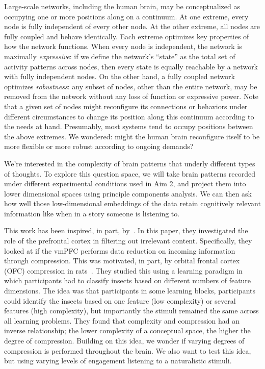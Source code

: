 \documentclass[english]{article}
\begin{document}
Large-scale networks, including the human brain, may be conceptualized as
occupying one or more positions along on a continuum. At one extreme, every
node is fully independent of every other node. At the other extreme, all nodes
are fully coupled and behave identically. Each extreme optimizes key properties
of how the network functions. When every node is independent, the network is
maximally \textit{expressive}: if we define the network's ``state'' as the
total set of activity patterns across nodes, then every state is equally
reachable by a network with fully independent nodes. On the other hand, a fully
coupled network optimizes \textit{robustness}: any subset of nodes, other than
the entire network, may be removed from the network without any loss of
function or expressive power. Note that a given set of nodes might reconfigure
its connections or behaviors under different circumstances to change its
position along this continuum according to the needs at hand. Presumably, most
systems tend to occupy positions between the above extremes. We wondered: might
the human brain reconfigure itself to be more flexible or more robust according
to ongoing demands?






We're interested in the complexity of brain patterns that underly different
types of thoughts. To explore this question space, we will take brain patterns
recorded under different experimental conditions used in Aim 2, and project
them into lower dimensional spaces using principle components analysis. We can
then ask how well those low-dimensional embeddings of the data retain
cognitively relevant information like when in a story someone is listening to.

This work has been inspired, in part, by~\cite{MackEtal20}. In this paper, they
investigated the role of the prefrontal cortex in filtering out irrelevant
content. Specifically, they looked at if the vmPFC performs data reduction on
incoming information through compression. This was motivated, in part, by
orbital frontal cortex (OFC) compression in rats~\citep{ZhouEtal19}. They
studied this using a learning paradigm in which participants had to classify
insects based on different numbers of feature dimensions. The idea was that
participants in some learning blocks, participants could identify the insects
based on one feature (low complexity) or several features (high complexity),
but importantly the stimuli remained the same across all learning problems.
They found that complexity and compression had an inverse relationship; the
lower complexity of a conceptual space, the higher the degree of compression.
Building on this idea, we wonder if varying degrees of compression is performed
throughout the brain. We also want to test this idea, but using varying levels
of engagement listening to a naturalistic stimuli.
\end{document}
